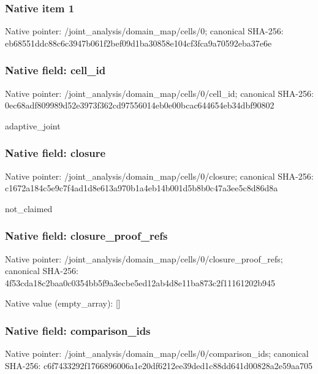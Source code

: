 \documentclass[10pt,a4paper]{article}
\begin{document}
\subsubsection{Native item 1}
Native pointer: /joint\_\allowbreak{}analysis/domain\_\allowbreak{}map/cells/0; canonical SHA-256: eb68551ddc88c6c3947b061f2bef09d1ba30858e104cf3fca9a70592eba37e6e

\subsubsection{Native field: cell\_\allowbreak{}id}
Native pointer: /joint\_\allowbreak{}analysis/domain\_\allowbreak{}map/cells/0/cell\_\allowbreak{}id; canonical SHA-256: 0ec68adf809989d52e3973f362cd97556014eb0e00bcac644654eb34dbf90802

\begingroup\raggedright\sloppy adaptive\_\allowbreak{}joint\par\endgroup

\subsubsection{Native field: closure}
Native pointer: /joint\_\allowbreak{}analysis/domain\_\allowbreak{}map/cells/0/closure; canonical SHA-256: c1672a184c5e9c7f4ad1d8e613a970b1a4eb14b001d5b8b0c47a3ee5c8d86d8a

\begingroup\raggedright\sloppy not\_\allowbreak{}claimed\par\endgroup

\subsubsection{Native field: closure\_\allowbreak{}proof\_\allowbreak{}refs}
Native pointer: /joint\_\allowbreak{}analysis/domain\_\allowbreak{}map/cells/0/closure\_\allowbreak{}proof\_\allowbreak{}refs; canonical SHA-256: 4f53cda18c2baa0c0354bb5f9a3ecbe5ed12ab4d8e11ba873c2f11161202b945

Native value (empty\_\allowbreak{}array): []

\subsubsection{Native field: comparison\_\allowbreak{}ids}
Native pointer: /joint\_\allowbreak{}analysis/domain\_\allowbreak{}map/cells/0/comparison\_\allowbreak{}ids; canonical SHA-256: c6f7433292f1766896006a1e20df6212ee39ded1c88dd641d00828a2e59aa705
\end{document}
